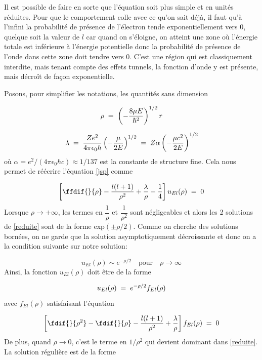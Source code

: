 Il est possible de faire en sorte que l'équation soit plus simple et en unités réduites. Pour que le comportement colle avec ce qu'on sait déjà, il faut qu'à l'infini la probabilité de présence de l'électron tende exponentiellement vers 0, quelque soit la valeur de $l$ car quand on s'éloigne, on atteint une zone où l'énergie totale est inférieure à l'énergie potentielle donc la probabilité de présence de l'onde dans cette zone doit tendre vers 0. C'est une région qui est classiquement interdite, mais tenant compte des effets tunnels, la fonction d'onde y est présente, mais décroît de façon exponentielle.


Posons, pour simplifier les notations, les quantités sans dimension

\[
    \rho\; = \;\left(-\dfrac{8\mu E}{\hbar^2}\right)^{1/2}r
\]

\begin{equation}
    \lambda\; = \;\dfrac{Ze^2}{4\pi\epsilon_0 \hbar}\left(-\dfrac{\mu}{2E}\right)^{1/2}\; = \; Z\alpha\left(-\dfrac{\mu c^2}{2E}\right)^{1/2}
    \label{lambda}
\end{equation}
où $\alpha=e^2/(4\pi\epsilon_0 \hbar c) \approx 1/137$ est la constante de structure fine. Cela nous permet de réécrire l'équation \eqref{jsp} comme


\begin{equation}
    \left[\ffdif{}{\rho}-\dfrac{l(l+1)}{\rho^2}+\dfrac{\lambda}{\rho}-\dfrac{1}{4}\right]u_{El}(\rho)\eq0
    \label{reduite}
\end{equation}
Lorsque $\rho \rightarrow +\infty$, les termes en $\dfrac{1}{\rho}$ et $\dfrac{1}{\rho^2}$ sont négligeables et alors les 2 solutions de \eqref{reduite} sont de la forme exp$(\pm \rho/2)$. Comme on cherche des solutions bornées, on ne garde que la solution asymptotiquement décroissante et donc on a la condition suivante sur notre solution:

\[
    u_{El}(\rho)\sim e^{-\rho/2} \quad \text{pour} \quad \rho \longrightarrow \infty
\]
Ainsi, la fonction $u_{El}(\rho)$ doit être de la forme

\[
    u_{El}(\rho)\; = \; e^{-\rho/2}f_{El}(\rho)
\]
avec $f_{El}(\rho)$ satisfaisant l'équation

\begin{equation}
 \left[\fdif{}{\rho^2}-\fdif{}{\rho}-\dfrac{l(l+1)}{\rho^2}+\dfrac{\lambda}{\rho}\right]f_{El}(\rho)\eq0
 \label{fel}
\end{equation}
De plus, quand $\rho \longrightarrow 0$, c'est le terme en $1/\rho^2$ qui devient dominant dans \eqref{reduite}. La solution régulière est de la forme

